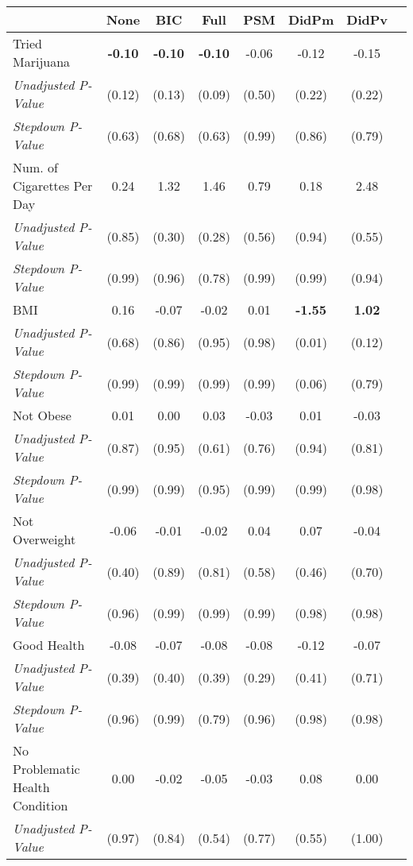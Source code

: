 \begin{tabular}{l c c c c c c c}
\toprule
 & None & BIC & Full & PSM & DidPm & DidPv \\
\midrule
Tried Marijuana & \textbf{ -0.10 } & \textbf{ -0.10 } & \textbf{ -0.10 } & -0.06 & -0.12 & -0.15 \\
\quad \textit{Unadjusted P-Value} & (0.12) & (0.13) & (0.09) & (0.50) & (0.22) & (0.22) \\
\quad \textit{Stepdown P-Value} & (0.63) & (0.68) & (0.63) & (0.99) & (0.86) & (0.79) \\
Num. of Cigarettes Per Day & 0.24 & 1.32 & 1.46 & 0.79 & 0.18 & 2.48 \\
\quad \textit{Unadjusted P-Value} & (0.85) & (0.30) & (0.28) & (0.56) & (0.94) & (0.55) \\
\quad \textit{Stepdown P-Value} & (0.99) & (0.96) & (0.78) & (0.99) & (0.99) & (0.94) \\
BMI & 0.16 & -0.07 & -0.02 & 0.01 & \textbf{ -1.55 } & \textbf{ 1.02 } \\
\quad \textit{Unadjusted P-Value} & (0.68) & (0.86) & (0.95) & (0.98) & (0.01) & (0.12) \\
\quad \textit{Stepdown P-Value} & (0.99) & (0.99) & (0.99) & (0.99) & (0.06) & (0.79) \\
Not Obese & 0.01 & 0.00 & 0.03 & -0.03 & 0.01 & -0.03 \\
\quad \textit{Unadjusted P-Value} & (0.87) & (0.95) & (0.61) & (0.76) & (0.94) & (0.81) \\
\quad \textit{Stepdown P-Value} & (0.99) & (0.99) & (0.95) & (0.99) & (0.99) & (0.98) \\
Not Overweight & -0.06 & -0.01 & -0.02 & 0.04 & 0.07 & -0.04 \\
\quad \textit{Unadjusted P-Value} & (0.40) & (0.89) & (0.81) & (0.58) & (0.46) & (0.70) \\
\quad \textit{Stepdown P-Value} & (0.96) & (0.99) & (0.99) & (0.99) & (0.98) & (0.98) \\
Good Health & -0.08 & -0.07 & -0.08 & -0.08 & -0.12 & -0.07 \\
\quad \textit{Unadjusted P-Value} & (0.39) & (0.40) & (0.39) & (0.29) & (0.41) & (0.71) \\
\quad \textit{Stepdown P-Value} & (0.96) & (0.99) & (0.79) & (0.96) & (0.98) & (0.98) \\
No Problematic Health Condition & 0.00 & -0.02 & -0.05 & -0.03 & 0.08 & 0.00 \\
\quad \textit{Unadjusted P-Value} & (0.97) & (0.84) & (0.54) & (0.77) & (0.55) & (1.00) \\

\end{tabular}
